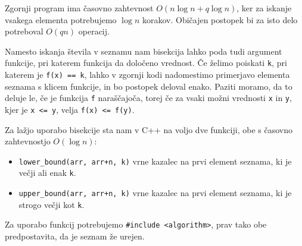Zgornji program ima časovno zahtevnost $O(n \log n + q \log n)$, ker za iskanje
vsakega elementa potrebujemo $\log n$ korakov.
Običajen postopek bi za isto delo potreboval $O(qn)$ operacij.

Namesto iskanja števila v seznamu nam bisekcija lahko poda tudi argument
funkcije, pri katerem funkcija da določeno vrednost.
Če želimo poiskati \verb+k+, pri katerem je \verb+f(x) == k+, lahko v zgornji
kodi nadomestimo primerjavo elementa seznama s klicem funkcije, in bo postopek
deloval enako.
Paziti moramo, da to deluje le, če je funkcija \verb+f+ naraščajoča, torej če za
vsaki možni vrednosti \verb+x+ in \verb+y+, kjer je \verb+x <= y+, velja
\verb+f(x) <= f(y)+.

Za lažjo uporabo bisekcije sta nam v C++ na voljo dve funkciji, obe s časovno
zahtevnostjo $O(\log n)$:
\begin{itemize}
\item \verb|lower_bound(arr, arr+n, k)| vrne kazalec na prvi element seznama,
  ki je večji ali enak \verb+k+.
\item \verb|upper_bound(arr, arr+n, k)| vrne kazalec na prvi element seznama, ki
  je strogo večji kot \verb+k+.
\end{itemize}
Za uporabo funkcij potrebujemo \verb+#include <algorithm>+, prav tako obe
predpostavita, da je seznam že urejen.

